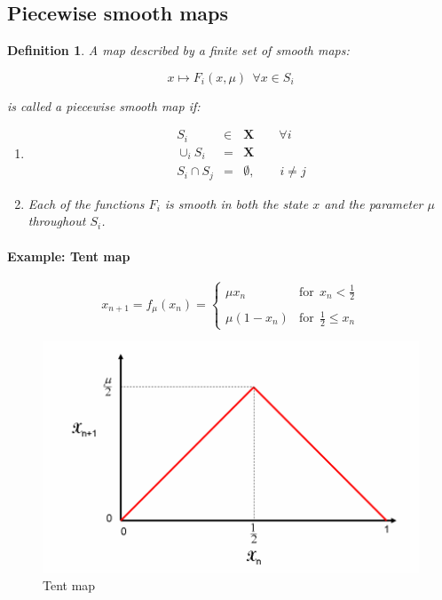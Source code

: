 \documentclass{book}
\renewcommand{\(}{\begin{columns}}
\renewcommand{\)}{\end{columns}}
\newcommand{\<}[1]{\begin{column}{#1}}
\renewcommand{\>}{\end{column}}
\newcommand{\para}{\paragraph}
\newtheorem{definition}{Definition}[section]
\begin{document}
\subsection{Piecewise smooth maps}

\begin{definition}
A map  described by a \emph{finite} set of \emph{smooth} maps:

\begin{equation}
\label{eq-pwmap}
x\mapsto F_i(x,\mu)~~\forall x\in S_i
\end{equation}

is called a piecewise smooth map if:

\begin{enumerate}
\item 
\begin{eqnarray*}
S_i&\in& \mathbf{X}\hspace{2em} \forall i\\
\cup_i S_i&=&\mathbf{X}\\
S_i\cap S_j&=&\emptyset, \hspace{2em} i\ne j
\end{eqnarray*}

\item Each of the functions $F_i$ is smooth in both the state $x$ and the parameter 
$\mu$ throughout $S_i$.  
\end{enumerate}
\end{definition}
\para{Example: Tent map}
\begin{equation}
\label{eq-tent}
x_{n+1}=f_\mu(x_n)=\begin{cases} \mu x_n & \mathrm{for}~~ x_n < \frac{1}{2} \\ \\ \mu (1-x_n) & \mathrm{for}~~ \frac{1}{2} \le x_n \end{cases}
\end{equation}


\begin{figure}[!htp]
\caption{Tent map}
\begin{center}
\includegraphics[width=0.7\columnwidth]{Tent_map}
\end{center}
\end{figure}
\end{document}
